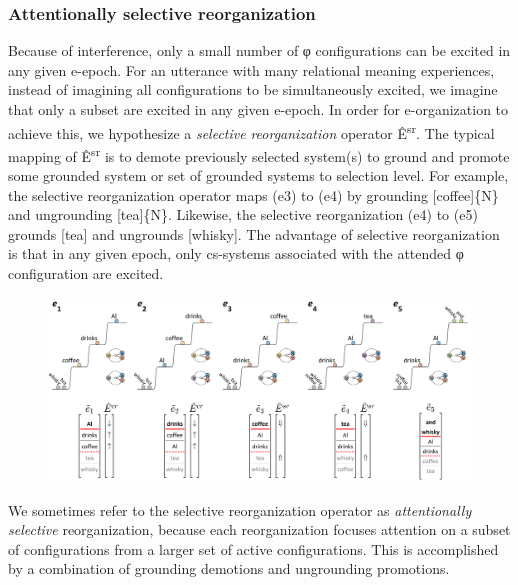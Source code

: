 \subsubsection{Attentionally selective reorganization}

Because of interference, only a small number of φ configurations can be excited in any given e-epoch. For an utterance with many relational meaning experiences, instead of imagining all configurations to be simultaneously excited, we imagine that only a subset are excited in any given e-epoch. In order for e-organization to achieve this, we hypothesize a \textit{selective} \textit{reorganization} operator Ê\textsuperscript{sr}. The typical mapping of  Ê\textsuperscript{sr} is to demote previously selected system(s) to ground and promote some grounded system or set of grounded systems to selection level. For example, the selective reorganization operator maps (e3) to (e4) by grounding [coffee]\{N\} and ungrounding [tea]\{N\}. Likewise, the selective reorganization (e4) to (e5) grounds [tea] and ungrounds [whisky]. The advantage of selective reorganization is that in any given epoch, only cs-systems associated with the attended φ configuration are excited.

  
\begin{figure}
\includegraphics[width=\textwidth]{figures/Tilsen-img99.png}
\caption{\missingcaption}
\label{fig:}
\end{figure}
   

  We sometimes refer to the selective reorganization operator as \textit{attentionally} \textit{selective} reorganization, because each reorganization focuses attention on a subset of configurations from a larger set of active configurations. This is accomplished by a combination of grounding demotions and ungrounding promotions.

